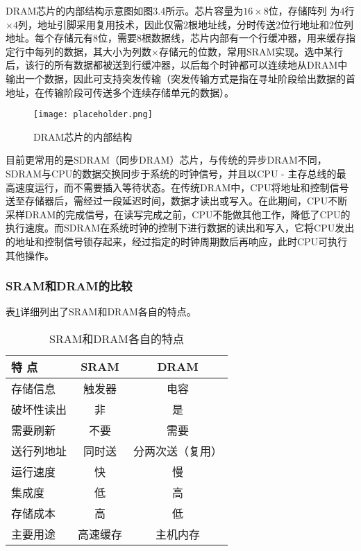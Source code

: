 \documentclass[UTF8]{ctexart}
\begin{document}
	DRAM芯片的内部结构示意图如图3.4所示。芯片容量为$16 \times 8$位，存储阵列 为$4$行$\times 4$列，地址引脚采用复用技术，因此仅需$2$根地址线，分时传送$2$位行地址和$2$位列地址。每个存储元有$8$位，需要$8$根数据线，芯片内部有一个行缓冲器，用来缓存指定行中每列的数据，其大小为列数$\times$存储元的位数，常用SRAM实现。选中某行后，该行的所有数据都被送到行缓冲器，以后每个时钟都可以连续地从DRAM中输出一个数据，因此可支持突发传输（突发传输方式是指在寻址阶段给出数据的首地址，在传输阶段可传送多个连续存储单元的数据）。
	
	\begin{figure}[h]
		\centering
		\caption{DRAM芯片的内部结构}
		\label{fig:DRAM_structure}
		\texttt{[image: placeholder.png]} 
	\end{figure}
	
	目前更常用的是SDRAM（同步DRAM）芯片，与传统的异步DRAM不同，SDRAM与CPU的数据交换同步于系统的时钟信号，并且以CPU - 主存总线的最高速度运行，而不需要插入等待状态。在传统DRAM中，CPU将地址和控制信号送至存储器后，需经过一段延迟时间，数据才读出或写入。在此期间，CPU不断采样DRAM的完成信号，在读写完成之前，CPU不能做其他工作，降低了CPU的执行速度。而SDRAM在系统时钟的控制下进行数据的读出和写入，它将CPU发出的地址和控制信号锁存起来，经过指定的时钟周期数后再响应，此时CPU可执行其他操作。
	
	\subsubsection{SRAM和DRAM的比较}
	表\ref{tab:SRAM_DRAM_comparison}详细列出了SRAM和DRAM各自的特点。
	
	\begin{table}[h]
		\centering
		\caption{SRAM和DRAM各自的特点}
		\label{tab:SRAM_DRAM_comparison}
		\begin{tabular}{lcc}
			\toprule
			\textbf{特 点} & \textbf{SRAM} & \textbf{DRAM} \\
			\midrule
			存储信息 & 触发器 & 电容 \\
			破坏性读出 & 非 & 是 \\
			需要刷新 & 不要 & 需要 \\
			送行列地址 & 同时送 & 分两次送（复用） \\
			运行速度 & 快 & 慢 \\
			集成度 & 低 & 高 \\
			存储成本 & 高 & 低 \\
			主要用途 & 高速缓存 & 主机内存 \\
			\bottomrule
		\end{tabular}
	\end{table}
	
\end{document}
